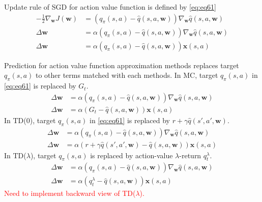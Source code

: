 \documentclass[
	10pt, %
]{article}
\theoremstyle{plain}
\newcommand{\mb}[1]{\mathbf{#1}}
\numberwithin{equation}{subsection} %
\begin{document}
Update rule of SGD for action value function is defined by \cref{eq:eq61}
\begin{equation} \label{eq:eq61}
    \begin{aligned}
        -\frac{1}{2} \nabla_\mb{w} J(\mb{w}) &= (q_\pi(s,a) - \hat{q}(s, a, \mb{w})) \nabla_\mb{w}\hat{q}(s, a, \mb{w}) \\
        \Delta \mb{w} &= \alpha (q_\pi(s, a) - \hat{q}(s, a, \mb{w})) \nabla_\mb{w} \hat{q}(s, a, \mb{w})\\
        \Delta \mb{w} &= \alpha (q_\pi(s, a) - \hat{q}(s, a, \mb{w}))\mb{x}(s,a)
    \end{aligned}
\end{equation}

Prediction for action value function approximation methods replaces target $q_\pi(s,a)$ to other terms matched with each methods.
In MC, target $q_\pi(s,a)$ in \cref{eq:eq61} is replaced by $G_t$.
\begin{equation} \label{eq:eq63}
    \begin{aligned}
        \Delta \mb{w} &= \alpha (q_\pi(s, a) - \hat{q}(s, a, \mb{w})) \nabla_\mb{w} \hat{q}(s, a, \mb{w})\\
        \Delta \mb{w} &= \alpha (G_t - \hat{q}(s, a, \mb{w}))\mb{x}(s,a)
    \end{aligned}
\end{equation}
In TD(0), target $q_\pi(s,a)$ in \cref{eq:eq61} is replaced by $r + \gamma \hat{q}(s', a', \mb{w})$.
\begin{equation} \label{eq:eq64}
    \begin{aligned}
        \Delta \mb{w} &= \alpha (q_\pi(s, a) - \hat{q}(s, a, \mb{w})) \nabla_\mb{w} \hat{q}(s, a, \mb{w})\\
        \Delta \mb{w} &= \alpha (r + \gamma \hat{q}(s', a', \mb{w})- \hat{q}(s, a, \mb{w}))\mb{x}(s,a)
    \end{aligned}
\end{equation}
In TD($\lambda$), target $q_\pi(s,a)$ is replaced by action-value $\lambda$-return $q^\lambda_t$.
\begin{equation} \label{eq:eq65}
    \begin{aligned}
        \Delta \mb{w} &= \alpha (q_\pi(s, a) - \hat{q}(s, a, \mb{w})) \nabla_\mb{w} \hat{q}(s, a, \mb{w})\\
        \Delta \mb{w} &= \alpha(q^\lambda_t - \hat{q}(s, a, \mb{w}))\mb{x}(s,a)
    \end{aligned}
\end{equation}
\textcolor{red}{Need to implement backward view of TD($
\lambda$).}
\end{document}
